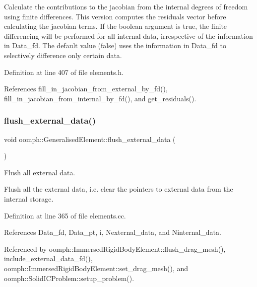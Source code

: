 Calculate the contributions to the jacobian from the internal degrees of freedom using finite differences. This version computes the residuals vector before calculating the jacobian terms. If the boolean argument is true, the finite differencing will be performed for all internal data, irrespective of the information in Data\+\_\+fd. The default value (false) uses the information in Data\+\_\+fd to selectively difference only certain data. 



Definition at line 407 of file elements.\+h.



References fill\+\_\+in\+\_\+jacobian\+\_\+from\+\_\+external\+\_\+by\+\_\+fd(), fill\+\_\+in\+\_\+jacobian\+\_\+from\+\_\+internal\+\_\+by\+\_\+fd(), and get\+\_\+residuals().

\mbox{\label{classoomph_1_1GeneralisedElement_aea4a43b909489688ecaf21c4c619fff1}} 
\subsubsection{\texorpdfstring{flush\+\_\+external\+\_\+data()}{flush\_external\_data()}\hspace{0.1cm}{\footnotesize\ttfamily [1/2]}}
{\footnotesize\ttfamily void oomph\+::\+Generalised\+Element\+::flush\+\_\+external\+\_\+data (\begin{DoxyParamCaption}{ }\end{DoxyParamCaption})}



Flush all external data. 

Flush all the external data, i.\+e. clear the pointers to external data from the internal storage. 

Definition at line 365 of file elements.\+cc.



References Data\+\_\+fd, Data\+\_\+pt, i, Nexternal\+\_\+data, and Ninternal\+\_\+data.



Referenced by oomph\+::\+Immersed\+Rigid\+Body\+Element\+::flush\+\_\+drag\+\_\+mesh(), include\+\_\+external\+\_\+data\+\_\+fd(), oomph\+::\+Immersed\+Rigid\+Body\+Element\+::set\+\_\+drag\+\_\+mesh(), and oomph\+::\+Solid\+I\+C\+Problem\+::setup\+\_\+problem().

